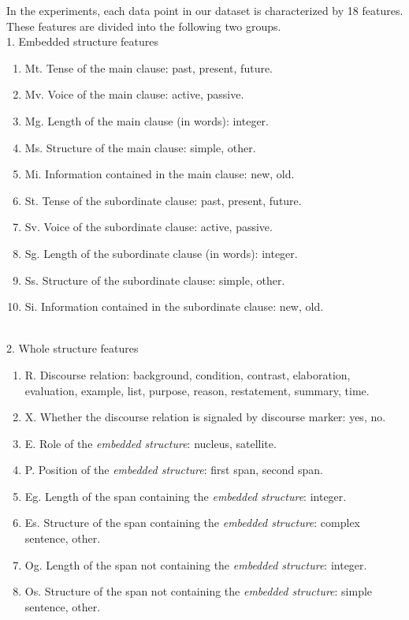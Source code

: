 \documentclass[english]{jnlp_1.2.0}
\begin{document}
In the experiments, each data point in our dataset is characterized 
by 18 features. These features are divided into the following two groups.
~\\
1. Embedded structure features
   \begin{enumerate}
    \item Mt. Tense of the main clause: past, present, future.  
    \item Mv. Voice of the main clause: active, passive.
    \item Mg. Length of the main clause (in words): integer.
    \item Ms. Structure of the main clause: simple, other.  
    \item Mi. Information contained in the main clause: new, old.
    \item St. Tense of the subordinate clause: past, present, future.
    \item Sv. Voice of the subordinate clause: active, passive.
    \item Sg. Length of the subordinate clause (in words): integer.
    \item Ss. Structure of the subordinate clause: simple, other.
    \item Si. Information contained in the subordinate clause: new, old.
  \end{enumerate}
~\\
2. Whole structure features
   \begin{enumerate}
   \item R. Discourse relation: background, condition, contrast, elaboration, evaluation, example, list, purpose, reason, restatement, summary, time.
   \item X. Whether the discourse relation is signaled by discourse marker: yes, no.
   \item E. Role of the \textit{embedded structure}: nucleus, satellite.
   \item P. Position of the \textit{embedded structure}: first span, second span.
   \item Eg. Length of the span containing the \textit{embedded structure}: integer.
   \item Es. Structure of the span containing the \textit{embedded structure}: complex sentence, other. 
   \item Og. Length of the span not containing the \textit{embedded structure}: integer.
   \item Os. Structure of the span not containing the \textit{embedded structure}: simple sentence, other.
  \end{enumerate}
\end{document}
